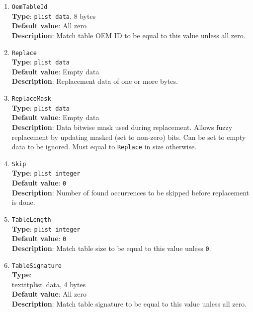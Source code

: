 \documentclass[]{article}
\begin{document}
\begin{enumerate}
\item
  \texttt{OemTableId}\\
  \textbf{Type}: \texttt{plist\ data}, 8 bytes\\
  \textbf{Default value}: All zero\\
  \textbf{Description}: Match table OEM ID to be equal to this value
  unless all zero.

\item
  \texttt{Replace}\\
  \textbf{Type}: \texttt{plist\ data}\\
  \textbf{Default value}: Empty data\\
  \textbf{Description}: Replacement data of one or more bytes.

\item
  \texttt{ReplaceMask}\\
  \textbf{Type}: \texttt{plist\ data}\\
  \textbf{Default value}: Empty data\\
  \textbf{Description}: Data bitwise mask used during replacement.
  Allows fuzzy replacement by updating masked (set to non-zero) bits. Can be
  set to empty data to be ignored. Must equal to \texttt{Replace} in size
  otherwise.

\item
  \texttt{Skip}\\
  \textbf{Type}: \texttt{plist\ integer}\\
  \textbf{Default value}: \texttt{0}\\
  \textbf{Description}: Number of found occurrences to be skipped before replacement
  is done.

\item
  \texttt{TableLength}\\
  \textbf{Type}: \texttt{plist\ integer}\\
  \textbf{Default value}: \texttt{0}\\
  \textbf{Description}: Match table size to be equal to this value
  unless \texttt{0}.

\item
  \texttt{TableSignature}\\
  \textbf{Type}: \\texttt{plist\ data}, 4 bytes\\
  \textbf{Default value}: All zero\\
  \textbf{Description}: Match table signature to be equal to this value
  unless all zero.

\end{enumerate}
\end{document}
